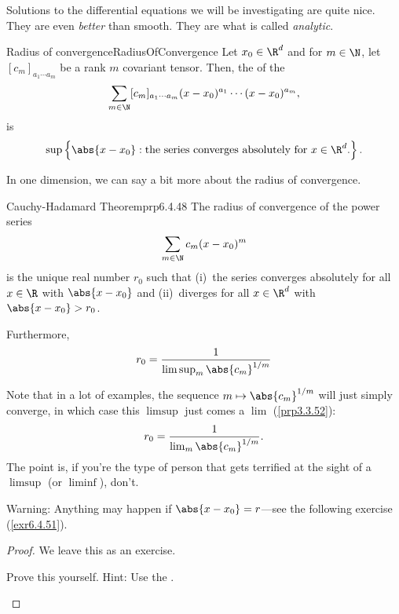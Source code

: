 Solutions to the differential equations we will be investigating are quite nice.  They are even \emph{better} than smooth.  They are what is called \emph{analytic}.
\begin{dfn}{Radius of convergence}{RadiusOfConvergence}
Let $x_0\in \R ^d$ and for $m\in \N$, let $[c_m]_{a_1\cdots a_m}$ be a rank $m$ covariant tensor.  Then, the  of the 
\begin{equation}
\sum _{m\in \N}[c_m]_{a_1\cdots a_m}(x-x_0)^{a_1}\cdots (x-x_0)^{a_m},
\end{equation}
is
\begin{equation*}
\sup \left\{ \abs{x-x_0}:\text{the series converges absolutely for }x\in \R ^d\text{.}\right\} .
\end{equation*}
\end{dfn}
In one dimension, we can say a bit more about the radius of convergence.
\begin{prp}{Cauchy-Hadamard Theorem}{prp6.4.48}
The radius of convergence of the power series
\begin{equation}
\sum _{m\in \N}c_m(x-x_0)^m
\end{equation}
is the unique real number $r_0$ such that (i)~the series converges absolutely for all $x\in \R$ with $\abs{x-x_0}$ and (ii)~diverges for all $x\in \R ^d$ with $\abs{x-x_0}>r_0$.

Furthermore,
\begin{equation}
r_0=\frac{1}{\limsup _m\abs{c_m}^{1/m}}
\end{equation}
\begin{rmk}
Note that in a lot of examples, the sequence $m\mapsto \abs{c_m}^{1/m}$ will just simply converge, in which case this $\limsup$ just comes a $\lim$ (\cref{prp3.3.52}):
\begin{equation}
r_0=\frac{1}{\lim _m\abs{c_m}^{1/m}}.
\end{equation}
The point is, if you're the type of person that gets terrified at the sight of a $\limsup$ (or $\liminf$), don't.
\end{rmk}
\begin{wrn}
Warning:  Anything may happen if $\abs{x-x_0}=r$---see the following exercise (\cref{exr6.4.51}).
\end{wrn}
\begin{proof}
We leave this as an exercise.
\begin{exr}[breakable=false]{}{}
Prove this yourself.  Hint:  Use the .
\end{exr}
\end{proof}
\end{prp}
